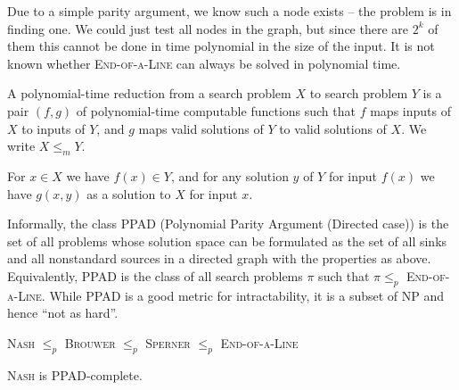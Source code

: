 Due to a simple parity argument, we know such a node exists -- the problem is
in finding one. We could just test all nodes in the graph, but since there are
$2^k$ of them this cannot be done in time polynomial in the size of the input.
It is not known whether \textsc{End-of-a-Line} can always be solved in
polynomial time.

\begin{definition}
	A polynomial-time reduction from a search problem $X$ to search problem $Y$
	is a pair $(f,g)$ of polynomial-time computable functions such that $f$
	maps inputs of $X$ to inputs of $Y$, and $g$ maps valid solutions of $Y$ to
	valid solutions of $X$. We write $X \le_m Y$.
\end{definition}

For $x \in X$ we have $f(x) \in Y$, and for any solution $y$ of $Y$ for input
$f(x)$ we have $g(x,y)$ as a solution to $X$ for input $x$.

Informally, the class PPAD (Polynomial Parity Argument (Directed case)) is the
set of all problems whose solution space can be formulated as the set of all
sinks and all nonstandard sources in a directed graph with the properties as
above. Equivalently, PPAD is the class of all search problems $\pi$ such that
$\pi \le_p$ \textsc{End-of-a-Line}. While PPAD is a good metric for
intractability, it is a subset of NP and hence ``not as hard''.

\begin{theorem}
	\textsc{Nash} $\le_p$ \textsc{Brouwer} $\le_p$ \textsc{Sperner} $\le_p$
	\textsc{End-of-a-Line}
\end{theorem}

\begin{theorem}[Goldberg, 2006]
	\textsc{Nash} is PPAD-complete.
\end{theorem}

